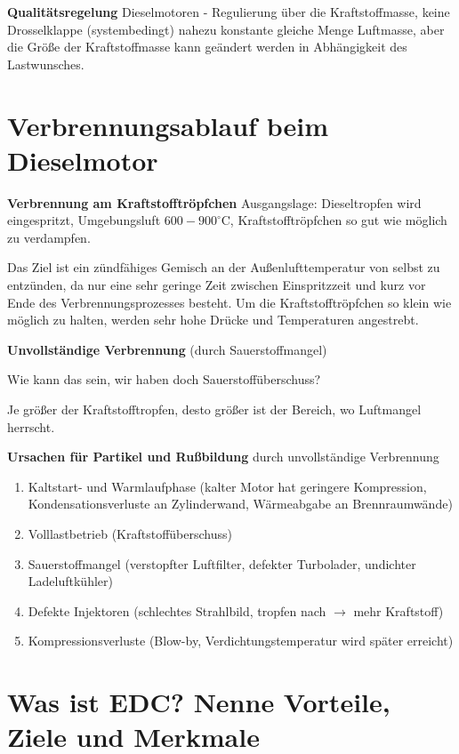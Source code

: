 \textbf{Qualitätsregelung} Dieselmotoren - Regulierung über die
Kraftstoffmasse, keine Drosselklappe (systembedingt) nahezu konstante
gleiche Menge Luftmasse, aber die Größe der Kraftstoffmasse kann
geändert werden in Abhängigkeit des Lastwunsches.

\section{Verbrennungsablauf beim
Dieselmotor}\label{verbrennungsablauf-beim-dieselmotor}

\textbf{Verbrennung am Kraftstofftröpfchen} Ausgangslage: Dieseltropfen
wird eingespritzt, Umgebungsluft $600 - 900^\circ\text{C}$,
Kraftstofftröpfchen so gut wie möglich zu verdampfen.

Das Ziel ist ein zündfähiges Gemisch an der Außenlufttemperatur von
selbst zu entzünden, da nur eine sehr geringe Zeit zwischen
Einspritzzeit und kurz vor Ende des Verbrennungsprozesses besteht. Um
die Kraftstofftröpfchen so klein wie möglich zu halten, werden sehr hohe
Drücke und Temperaturen angestrebt.

\textbf{Unvollständige Verbrennung} (durch Sauerstoffmangel)

Wie kann das sein, wir haben doch Sauerstoffüberschuss?

Je größer der Kraftstofftropfen, desto größer ist der Bereich, wo
Luftmangel herrscht.

\textbf{Ursachen für Partikel und Rußbildung} durch unvollständige
Verbrennung

\begin{enumerate}
\item
  Kaltstart- und Warmlaufphase (kalter Motor hat geringere Kompression,
  Kondensationsverluste an Zylinderwand, Wärmeabgabe an Brennraumwände)
\item
  Volllastbetrieb (Kraftstoffüberschuss)
\item
  Sauerstoffmangel (verstopfter Luftfilter, defekter Turbolader,
  undichter Ladeluftkühler)
\item
  Defekte Injektoren (schlechtes Strahlbild, tropfen nach $\to$ mehr
  Kraftstoff)
\item
  Kompressionsverluste (Blow-by, Verdichtungstemperatur wird später
  erreicht)
\end{enumerate}

\section{Was ist EDC? Nenne Vorteile, Ziele und
Merkmale}\label{was-ist-edc-nenne-vorteile-ziele-und-merkmale}

